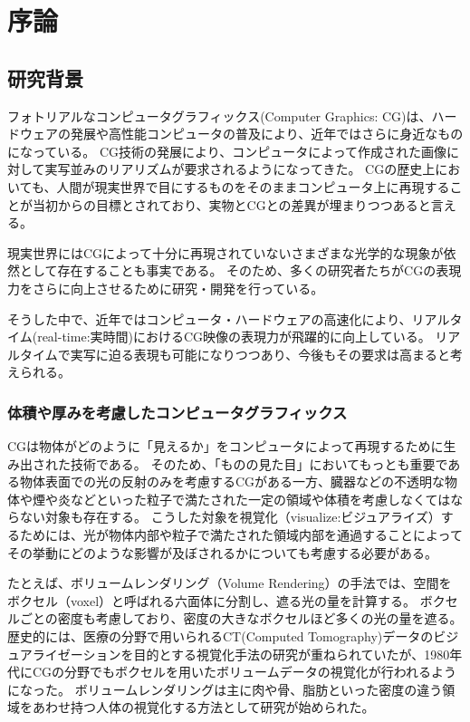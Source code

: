 \chapter{序論}
\label{CBegin}

\section{研究背景}
\label{SBackground}

フォトリアルなコンピュータグラフィックス(Computer Graphics: CG)は、ハードウェアの発展や高性能コンピュータの普及により、近年ではさらに身近なものになっている。
CG技術の発展により、コンピュータによって作成された画像に対して実写並みのリアリズムが要求されるようになってきた。
CGの歴史上においても、人間が現実世界で目にするものをそのままコンピュータ上に再現することが当初からの目標とされており、実物とCGとの差異が埋まりつつあると言える。

現実世界にはCGによって十分に再現されていないさまざまな光学的な現象が依然として存在することも事実である。
そのため、多くの研究者たちがCGの表現力をさらに向上させるために研究・開発を行っている。

そうした中で、近年ではコンピュータ・ハードウェアの高速化により、リアルタイム(real-time:実時間)におけるCG映像の表現力が飛躍的に向上している。
リアルタイムで実写に迫る表現も可能になりつつあり\cite{jorge-jimenez2013}、今後もその要求は高まると考えられる。


\subsection{体積や厚みを考慮したコンピュータグラフィックス}
\label{SSVolumerendering}

CGは物体がどのように「見えるか」をコンピュータによって再現するために生み出された技術である。
そのため、「ものの見た目」においてもっとも重要である物体表面での光の反射のみを考慮するCGがある一方、臓器などの不透明な物体や煙や炎などといった粒子で満たされた一定の領域や体積を考慮しなくてはならない対象も存在する。
こうした対象を視覚化（visualize:ビジュアライズ）するためには、光が物体内部や粒子で満たされた領域内部を通過することによってその挙動にどのような影響が及ぼされるかについても考慮する必要がある。

たとえば、ボリュームレンダリング（Volume Rendering）の手法では、空間をボクセル（voxel）と呼ばれる六面体に分割し、遮る光の量を計算する。
ボクセルごとの密度も考慮しており、密度の大きなボクセルほど多くの光の量を遮る。
歴史的には、医療の分野で用いられるCT(Computed Tomography)データのビジュアライゼーションを目的とする視覚化手法の研究が重ねられていたが、1980年代にCGの分野でもボクセルを用いたボリュームデータの視覚化が行われるようになった\cite{cg-magic}。
ボリュームレンダリングは主に肉や骨、脂肪といった密度の違う領域をあわせ持つ人体の視覚化する方法として研究が始められた。

